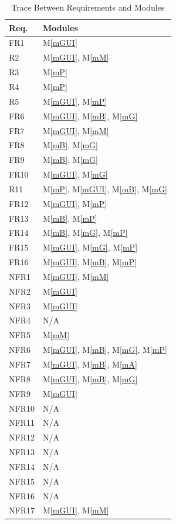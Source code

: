 \documentclass[12pt, titlepage]{article}
\newcommand{\mref}[1]{M\ref{#1}}
\begin{document}
\begin{table}[H]
\centering
\begin{tabular}{p{} p{}}
\toprule
\textbf{Req.} & \textbf{Modules}\\
\midrule
FR1 & \mref{mGUI}\\
R2 & \mref{mGUI}, \mref{mM}\\
R3 & \mref{mP}\\
R4 & \mref{mP}\\
R5 & \mref{mGUI}, \mref{mP}\\
FR6 & \mref{mGUI}, \mref{mB}, \mref{mG}\\
FR7 & \mref{mGUI}, \mref{mM}\\
FR8 & \mref{mB}, \mref{mG}\\
FR9 & \mref{mB}, \mref{mG}\\
FR10 & \mref{mGUI}, \mref{mG}\\
R11 & \mref{mP}, \mref{mGUI}, \mref{mB}, \mref{mG}\\
FR12 & \mref{mGUI}, \mref{mP}\\
FR13 & \mref{mB}, \mref{mP}\\
FR14 & \mref{mB}, \mref{mG}, \mref{mP}\\
FR15 & \mref{mGUI}, \mref{mG}, \mref{mP}\\
FR16 & \mref{mGUI}, \mref{mB}, \mref{mP}\\

NFR1 & \mref{mGUI}, \mref{mM}\\
NFR2 & \mref{mGUI}\\
NFR3 & \mref{mGUI}\\
NFR4 & N/A\\
NFR5 & \mref{mM}\\

NFR6 & \mref{mGUI}, \mref{mB}, \mref{mG}, \mref{mP}\\
NFR7 & \mref{mGUI}, \mref{mB}, \mref{mA}\\
NFR8 & \mref{mGUI}, \mref{mB}, \mref{mG}\\
NFR9 & \mref{mGUI}\\

NFR10 & N/A\\
NFR11 & N/A\\
NFR12 & N/A\\
NFR13 & N/A\\
NFR14 & N/A\\
NFR15 & N/A\\
NFR16 & N/A\\
NFR17 & \mref{mGUI}, \mref{mM}\\
\bottomrule
\end{tabular}
\caption{Trace Between Requirements and Modules}
\label{TblRT}
\end{table}
\end{document}
